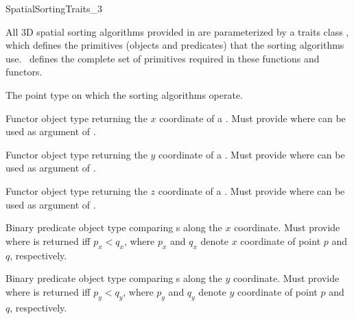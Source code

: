 

\begin{ccRefConcept}{SpatialSortingTraits_3}

\ccDefinition
  
All 3D spatial sorting algorithms provided in \cgal{} are parameterized
by a traits class , which defines the
primitives (objects and predicates) that the sorting algorithms use.
\ccRefName\ defines the complete set of primitives required in these
functions and functors.

\ccTypes
\ccAutoIndexingOff
{}

%
       {The point type on which the sorting algorithms operate.}


%
       {Functor object type returning the $x$ coordinate of a  .
       Must provide 
         where  can be used as
        argument of .
       }

%
       {Functor object type returning the $y$ coordinate of a  .
       Must provide 
         where  can be used as
        argument of .
       }

%
       {Functor object type returning the $z$ coordinate of a  .
       Must provide 
         where  can be used as
        argument of .
       }


%
       {Binary predicate object type comparing s
        along the $x$ coordinate.
        Must provide 
         where 
        is returned iff $p_x < q_x$,
        where $p_x$ and $q_x$ denote $x$ coordinate of point $p$ and $q$,
        respectively.
       }

%
       {Binary predicate object type comparing s
        along the $y$ coordinate.
        Must provide 
         where 
        is returned iff $p_y < q_y$,
        where $p_y$ and $q_y$ denote $y$ coordinate of point $p$ and $q$,
        respectively.
       }


\end{ccRefConcept}
